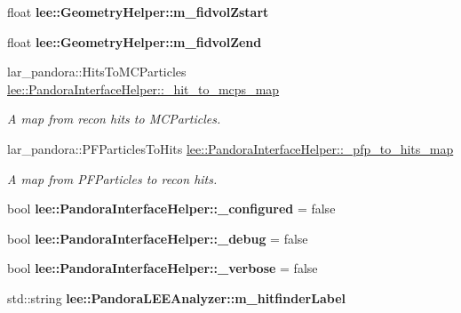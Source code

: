 \begin{DoxyCompactItemize}
\item 
\hypertarget{group__lee_gab0846ac674a2c392a95f7e3c36ee5981}{float {\bfseries lee\-::\-Geometry\-Helper\-::m\-\_\-fidvol\-Zstart}}\label{group__lee_gab0846ac674a2c392a95f7e3c36ee5981}

\item 
\hypertarget{group__lee_ga33ed7b1dc9f343d6f048ab67e69ab567}{float {\bfseries lee\-::\-Geometry\-Helper\-::m\-\_\-fidvol\-Zend}}\label{group__lee_ga33ed7b1dc9f343d6f048ab67e69ab567}

\item 
\hypertarget{group__lee_gadd430a976fa40632e14eb1688cdd785b}{lar\-\_\-pandora\-::\-Hits\-To\-M\-C\-Particles \hyperlink{group__lee_gadd430a976fa40632e14eb1688cdd785b}{lee\-::\-Pandora\-Interface\-Helper\-::\-\_\-hit\-\_\-to\-\_\-mcps\-\_\-map}}\label{group__lee_gadd430a976fa40632e14eb1688cdd785b}

\begin{DoxyCompactList}\small\item\em A map from recon hits to M\-C\-Particles. \end{DoxyCompactList}\item 
\hypertarget{group__lee_gae19df94cb2c29dc2735bf7436c5ccf63}{lar\-\_\-pandora\-::\-P\-F\-Particles\-To\-Hits \hyperlink{group__lee_gae19df94cb2c29dc2735bf7436c5ccf63}{lee\-::\-Pandora\-Interface\-Helper\-::\-\_\-pfp\-\_\-to\-\_\-hits\-\_\-map}}\label{group__lee_gae19df94cb2c29dc2735bf7436c5ccf63}

\begin{DoxyCompactList}\small\item\em A map from P\-F\-Particles to recon hits. \end{DoxyCompactList}\item 
\hypertarget{group__lee_ga2adc9100d7afd42201e3b158c537231c}{bool {\bfseries lee\-::\-Pandora\-Interface\-Helper\-::\-\_\-configured} = false}\label{group__lee_ga2adc9100d7afd42201e3b158c537231c}

\item 
\hypertarget{group__lee_gab8e095d1281cac84da211ba143991440}{bool {\bfseries lee\-::\-Pandora\-Interface\-Helper\-::\-\_\-debug} = false}\label{group__lee_gab8e095d1281cac84da211ba143991440}

\item 
\hypertarget{group__lee_ga39213dbd10338e8fefb3b6756f2e9cb3}{bool {\bfseries lee\-::\-Pandora\-Interface\-Helper\-::\-\_\-verbose} = false}\label{group__lee_ga39213dbd10338e8fefb3b6756f2e9cb3}

\item 
\hypertarget{group__lee_gaf8a8c564772112b2c47945afcf674484}{std\-::string {\bfseries lee\-::\-Pandora\-L\-E\-E\-Analyzer\-::m\-\_\-hitfinder\-Label}}\label{group__lee_gaf8a8c564772112b2c47945afcf674484}


\end{DoxyCompactItemize}
